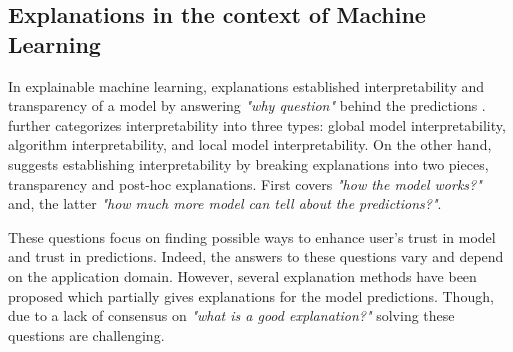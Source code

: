 \documentclass[english]{tktltiki2}
\theoremstyle{definition}
\theoremstyle{remark}
\begin{document}


\subsection{Explanations in the context of Machine Learning} %
In explainable machine learning, explanations established interpretability and transparency of a model by answering {\itshape "why question" } behind the predictions \citep{honegger2018shedding}. \citet{honegger2018shedding} further categorizes interpretability into three types: global model interpretability, algorithm interpretability, and local model interpretability. On the other hand, \citet{lipton2016mythos} suggests establishing interpretability by breaking explanations into two pieces, transparency and post-hoc explanations. First covers {\itshape "how the model works?"} and, the latter {\itshape "how much more model can tell about the predictions?"}.

These questions focus on finding possible ways to enhance user's trust in model and trust in predictions. Indeed, the answers to these questions vary and depend on the application domain. However, several explanation methods have been proposed which partially gives explanations for the model predictions. Though, due to a lack of consensus on {\itshape "what is a good explanation?"} solving these questions are challenging.
\end{document}
